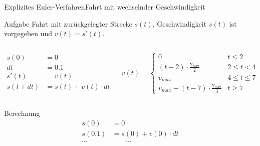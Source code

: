 \documentclass[xelatex,aspectratio=169]{beamer}
\begin{document}
\begin{frame}{Explizites Euler-Verfahren}{Fahrt mit wechselnder Geschwindigkeit}
    \begin{block}{Aufgabe}
        Fahrt mit zurückgelegter Strecke $s(t)$, Geschwindigkeit $v(t)$ ist vorgegeben und $v(t) = s'(t)$.
        \begin{columns}[onlytextwidth]
            \begin{column}{0.5\textwidth}
                \[
                    \begin{aligned}
                        s(0)    & = 0                    \\
                        dt      & = 0.1                  \\
                        s'(t)   & = v(t)                 \\
                        s(t+dt) & = s(t) + v(t) \cdot dt
                    \end{aligned}
                \]
            \end{column}
            \begin{column}{0.5\textwidth}
                \[
                    v(t) = \begin{cases}
                        0                                                  & t \leq 2        \\
                        (t-2) \cdot \frac{\mathrm{v_{max}}}{2}             & 2 \leq t < 4    \\
                        v_{max}                                            & 4 \leq t \leq 7 \\
                        v_{max} - (t - 7) \cdot \frac{\mathrm{v_{max}}}{3} & t \geq 7
                    \end{cases}
                \]
            \end{column}
        \end{columns}
    \end{block}

    \begin{block}{Berechnung}
        \[
            \begin{aligned}
                s(0)   & = 0                    \\
                s(0.1) & = s(0) + v(0) \cdot dt \\
                \cdots & \qquad\cdots           \\
            \end{aligned}
        \]
    \end{block}
\end{frame}
\end{document}
